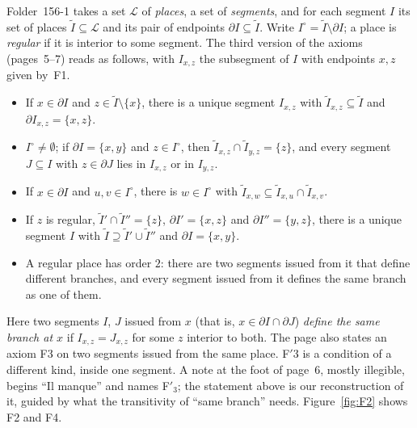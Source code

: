 \documentclass[11pt,a4paper]{amsart}
\theoremstyle{definition}
\theoremstyle{remark}
\newcommand{\cL}{\mathcal L}
\begin{document}
Folder~156-1 takes a set $\cL$ of \emph{places}, a set of \emph{segments}, and for each segment $I$ its set of places $\widetilde I \subseteq \cL$ and its pair of endpoints $\partial I \subseteq \widetilde I$. Write $I^\circ = \widetilde I \setminus \partial I$; a place is \emph{regular} if it is interior to some segment. The third version of the axioms (pages~5--7) reads as follows, with $I_{x,z}$ the subsegment of $I$ with endpoints $x, z$ given by~F1.
\begin{itemize}[leftmargin=3em]
\item[F1] If $x \in \partial I$ and $z \in \widetilde I \setminus \{x\}$, there is a unique segment $I_{x,z}$ with $\widetilde I_{x,z} \subseteq \widetilde I$ and $\partial I_{x,z} = \{x, z\}$.
\item[F2] $I^\circ \ne \emptyset$; if $\partial I = \{x, y\}$ and $z \in I^\circ$, then $\widetilde I_{x,z} \cap \widetilde I_{y,z} = \{z\}$, and every segment $J \subseteq I$ with $z \in \partial J$ lies in $I_{x,z}$ or in $I_{y,z}$.
\item[F$'$3] If $x \in \partial I$ and $u, v \in I^\circ$, there is $w \in I^\circ$ with $\widetilde I_{x,w} \subseteq \widetilde I_{x,u} \cap \widetilde I_{x,v}$.
\item[F4] If $z$ is regular, $\widetilde I' \cap \widetilde I'' = \{z\}$, $\partial I' = \{x, z\}$ and $\partial I'' = \{y, z\}$, there is a unique segment $I$ with $\widetilde I \supseteq \widetilde I' \cup \widetilde I''$ and $\partial I = \{x, y\}$.
\item[F5] A regular place has order $2$: there are two segments issued from it that define different branches, and every segment issued from it defines the same branch as one of them.
\end{itemize}
Here two segments $I$, $J$ issued from $x$ (that is, $x \in \partial I \cap \partial J$) \emph{define the same branch at $x$} if $I_{x,z} = J_{x,z}$ for some $z$ interior to both. The page also states an axiom F3 on two segments issued from the same place. F$'$3 is a condition of a different kind, inside one segment. A note at the foot of page~6, mostly illegible, begins ``Il manque'' and names F$'_3$; the statement above is our reconstruction of it, guided by what the transitivity of ``same branch'' needs. Figure~\ref{fig:F2} shows F2 and F4.
\end{document}
